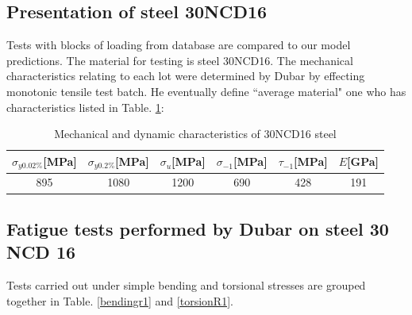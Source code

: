 \subsection{Presentation of steel 30NCD16}
Tests with blocks of loading from database are compared to our model predictions. The material for testing is steel 30NCD16. The mechanical characteristics relating to each lot were determined by Dubar \cite{Dubar1992} by effecting monotonic tensile test batch. He eventually define ``average material" one who has characteristics listed in Table. \ref{30ncdchar}:

\begin{table}[!h]
\centering
\begin{tabular}{|c|c|c|c|l|c|}
\hline
\textbf{$\sigma_{y0.02\%}${[}MPa{]}} & \textbf{$\sigma_{y0.2\%}${[}MPa{]}} & \textbf{$\sigma_u${[}MPa{]}} & \textbf{$\sigma_{-1}${[}MPa{]}} & \textbf{$\tau_{-1}${[}MPa{]}} & \textbf{$E${[}GPa{]}}\\ \hline
895                                  & 1080                                & 1200                         & 690                             & \multicolumn{1}{c|}{428}     & 191 \\ \hline
\end{tabular}
\caption{Mechanical and dynamic characteristics of 30NCD16 steel \cite{Dubar1992}}
\label{30ncdchar}
\end{table}

\subsection{Fatigue tests performed by Dubar on steel 30 NCD 16}
Tests carried out under simple bending and torsional stresses are grouped together in
Table. \ref{bendingr1} and \ref{torsionR1}.

